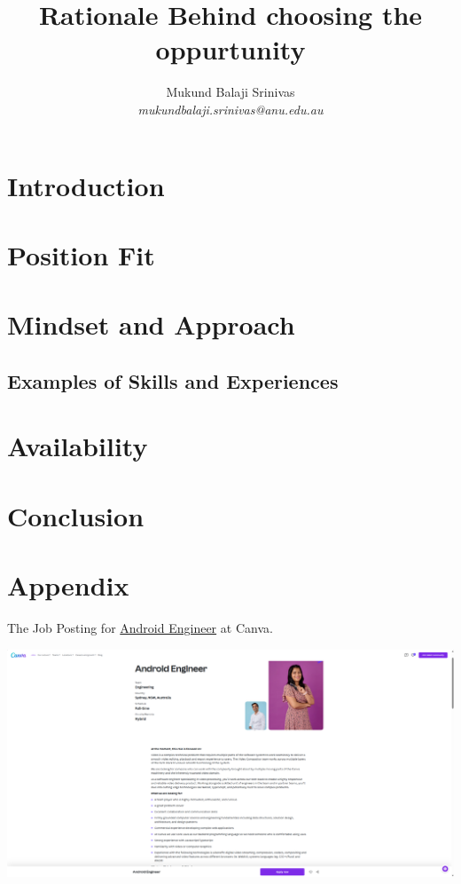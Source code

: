 \documentclass{article}
\title{Rationale Behind choosing the oppurtunity}
\author{Mukund Balaji Srinivas\\\textit{mukundbalaji.srinivas@anu.edu.au}}
\begin{document}
\maketitle

\section*{Introduction}


\section*{Position Fit}


\section*{Mindset and Approach}


\subsection*{Examples of Skills and Experiences}

\section*{Availability}


\section*{Conclusion}

\newpage
\section*{Appendix}

The Job Posting for \href{https://www.lifeatcanva.com/en/jobs/743999989773993/android-engineer/}{Android Engineer} at Canva.
\vspace{1cm}

\begin{center}
\includegraphics[width=\textwidth]{../job_posting.png}
\end{center}
\end{document}
